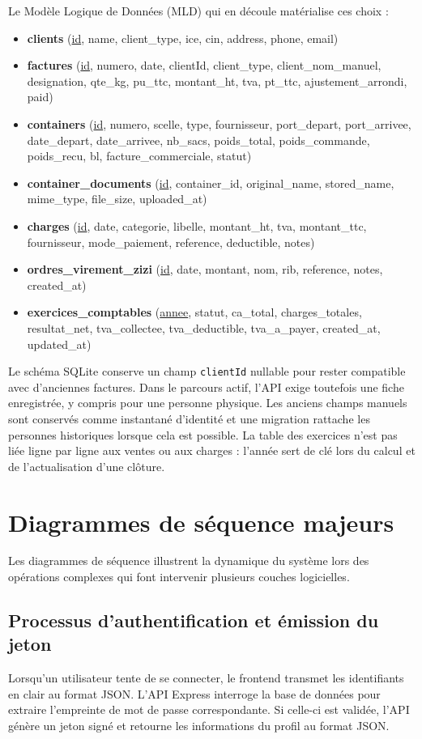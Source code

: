 \documentclass[12pt,a4paper,oneside]{report}
\newcommand{\code}[1]{\texttt{#1}}
\begin{document}
Le Modèle Logique de Données (MLD) qui en découle matérialise ces choix :
\begin{itemize}
  \item \textbf{clients} (\underline{id}, name, client\_type, ice, cin, address, phone, email)
  \item \textbf{factures} (\underline{id}, numero, date, clientId, client\_type, client\_nom\_manuel, designation, qte\_kg, pu\_ttc, montant\_ht, tva, pt\_ttc, ajustement\_arrondi, paid)
  \item \textbf{containers} (\underline{id}, numero, scelle, type, fournisseur, port\_depart, port\_arrivee, date\_depart, date\_arrivee, nb\_sacs, poids\_total, poids\_commande, poids\_recu, bl, facture\_commerciale, statut)
  \item \textbf{container\_documents} (\underline{id}, container\_id, original\_name, stored\_name, mime\_type, file\_size, uploaded\_at)
  \item \textbf{charges} (\underline{id}, date, categorie, libelle, montant\_ht, tva, montant\_ttc, fournisseur, mode\_paiement, reference, deductible, notes)
  \item \textbf{ordres\_virement\_zizi} (\underline{id}, date, montant, nom, rib, reference, notes, created\_at)
  \item \textbf{exercices\_comptables} (\underline{annee}, statut, ca\_total, charges\_totales, resultat\_net, tva\_collectee, tva\_deductible, tva\_a\_payer, created\_at, updated\_at)
\end{itemize}

Le schéma SQLite conserve un champ \code{clientId} nullable pour rester compatible avec d'anciennes factures. Dans le parcours actif, l'API exige toutefois une fiche enregistrée, y compris pour une personne physique. Les anciens champs manuels sont conservés comme instantané d'identité et une migration rattache les personnes historiques lorsque cela est possible. La table des exercices n'est pas liée ligne par ligne aux ventes ou aux charges : l'année sert de clé lors du calcul et de l'actualisation d'une clôture.

\section{Diagrammes de séquence majeurs}
Les diagrammes de séquence illustrent la dynamique du système lors des opérations complexes qui font intervenir plusieurs couches logicielles.

\subsection{Processus d'authentification et émission du jeton}
Lorsqu'un utilisateur tente de se connecter, le frontend transmet les identifiants en clair au format JSON. L'API Express interroge la base de données pour extraire l'empreinte de mot de passe correspondante. Si celle-ci est validée, l'API génère un jeton signé et retourne les informations du profil au format JSON.
\end{document}
